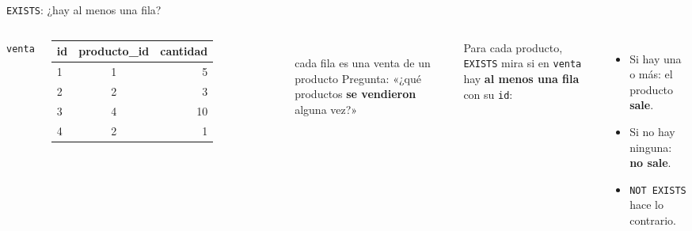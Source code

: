 \documentclass[aspectratio=169,10pt,c]{beamer}
\newcommand{\tbl}[1]{\textcolor{utpNaranja}{\texttt{#1}}}
\begin{document}
\begin{frame}{\texttt{EXISTS}: ¿hay al menos una fila?}
\begin{columns}[c,onlytextwidth]
\centering\tbl{venta}\\[4pt]
\scriptsize\ttfamily
\begin{tabular}{lcr}
\toprule
\normalfont\bfseries id & \normalfont\bfseries producto\_id & \normalfont\bfseries cantidad \\
\midrule
1 & 1 & 5 \\
2 & 2 & 3 \\
3 & 4 & 10 \\
4 & 2 & 1 \\
\bottomrule
\end{tabular}\\[5pt]
\normalfont\tiny\color{utpGris}cada fila es una venta de un producto
\small Pregunta: «¿qué productos \textbf{se vendieron} alguna vez?»
\vspace{0.3cm}

\small Para cada producto, \texttt{EXISTS} mira si en \tbl{venta} hay \textbf{al menos una fila} con su \texttt{id}:
\vspace{0.2cm}
\begin{itemize}\setlength\itemsep{4pt}
  \item Si hay una o más: el producto \textbf{sale}.
  \item Si no hay ninguna: \textbf{no sale}.
  \item \texttt{NOT EXISTS} hace lo contrario.
\end{itemize}
\end{columns}
\vspace{0.4cm}
\end{frame}
\end{document}
